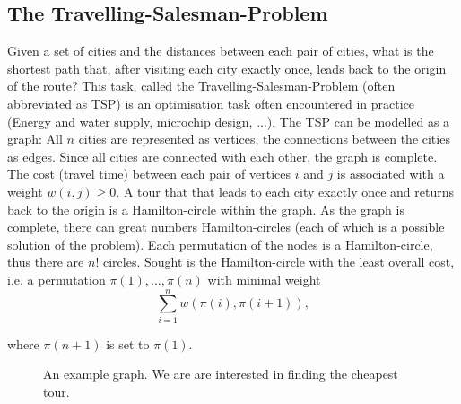 \documentclass[10pt,a4paper,DIV=11]{scrreprt}
\begin{document}
\subsection{The Travelling-Salesman-Problem}
Given a set of cities and the distances between each pair of cities, what is the shortest path that, after visiting each city exactly once, 
leads back to the origin of the route? This task, called the Travelling-Salesman-Problem (often abbreviated as TSP) is an optimisation task 
often encountered in practice (Energy and water supply, microchip design, ...). The TSP can be modelled as a graph: All $n$ cities are represented 
as vertices, the connections between the cities as edges. Since all cities are connected with each other, the graph is complete. 
The cost (travel time) between each pair of vertices $i$ and $j$ is associated with a weight $w(i,j) \geq 0$. 
A tour that that leads to each city exactly once and returns back to the origin is a Hamilton-circle within the graph. As the graph is complete, 
there can great numbers Hamilton-circles (each of which is a possible solution of the problem). 
Each permutation of the nodes is a Hamilton-circle, thus there are $n!$ circles. Sought is the Hamilton-circle with the least overall cost, i.e. a 
permutation $\pi(1),\dots,\pi(n)$ with minimal weight
\begin{equation}
    \sum\limits_{i=1}^n w(\pi(i),\pi(i+1)), 
\end{equation}

where $\pi(n+1)$ is set to $\pi(1)$.\cite{MATHINF}\\

\begin{figure}[H]
\centering
\caption{An example graph. We are are interested in finding the cheapest tour.\cite{MATHINF}}
\label{fig:tsp}
\end{figure}
\end{document}
